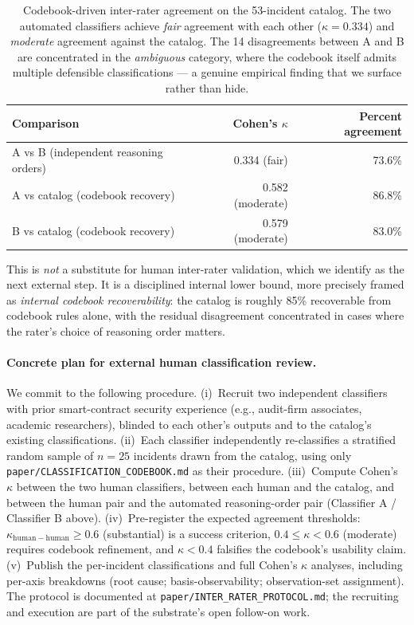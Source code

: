\documentclass[11pt,a4paper]{article}
\begin{document}
\begin{table}[h]
\centering
\small
\begin{tabular}{lrr}
\toprule
Comparison & Cohen's $\kappa$ & Percent agreement \\
\midrule
A vs B (independent reasoning orders) & 0.334 (fair) & 73.6\% \\
A vs catalog (codebook recovery) & 0.582 (moderate) & 86.8\% \\
B vs catalog (codebook recovery) & 0.579 (moderate) & 83.0\% \\
\bottomrule
\end{tabular}
\caption{Codebook-driven inter-rater agreement on the 53-incident catalog. The two automated classifiers achieve \emph{fair} agreement with each other ($\kappa = 0.334$) and \emph{moderate} agreement against the catalog. The 14 disagreements between A and B are concentrated in the \emph{ambiguous} category, where the codebook itself admits multiple defensible classifications --- a genuine empirical finding that we surface rather than hide.}\label{tab:inter-rater}
\end{table}

This is \emph{not} a substitute for human inter-rater validation, which we identify as the next external step. It is a disciplined internal lower bound, more precisely framed as \emph{internal codebook recoverability}: the catalog is roughly 85\% recoverable from codebook rules alone, with the residual disagreement concentrated in cases where the rater's choice of reasoning order matters.

\paragraph{Concrete plan for external human classification review.} We commit to the following procedure. (i)~Recruit two independent classifiers with prior smart-contract security experience (e.g., audit-firm associates, academic researchers), blinded to each other's outputs and to the catalog's existing classifications. (ii)~Each classifier independently re-classifies a stratified random sample of $n = 25$ incidents drawn from the catalog, using only \texttt{paper/CLASSIFICATION\_CODEBOOK.md} as their procedure. (iii)~Compute Cohen's $\kappa$ between the two human classifiers, between each human and the catalog, and between the human pair and the automated reasoning-order pair (Classifier A / Classifier B above). (iv)~Pre-register the expected agreement thresholds: $\kappa_{\mathrm{human-human}} \geq 0.6$ (substantial) is a success criterion, $0.4 \leq \kappa < 0.6$ (moderate) requires codebook refinement, and $\kappa < 0.4$ falsifies the codebook's usability claim. (v)~Publish the per-incident classifications and full Cohen's $\kappa$ analyses, including per-axis breakdowns (root cause; basis-observability; observation-set assignment). The protocol is documented at \texttt{paper/INTER\_RATER\_PROTOCOL.md}; the recruiting and execution are part of the substrate's open follow-on work.
\end{document}
